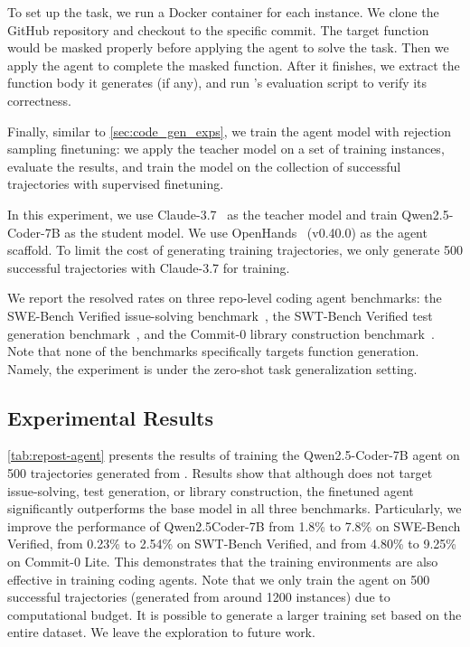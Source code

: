 To set up the task, we run a Docker container for each \reposttrainsetName instance. We clone the GitHub repository and checkout to the specific commit. The target function would be masked properly before applying the agent to solve the task.
Then we apply the agent to complete the masked function.
After it finishes, we extract the function body it generates (if any), and run \repostmethodName's evaluation script to verify its correctness.

Finally, similar to \autoref{sec:code_gen_exps}, we train the agent model with rejection sampling finetuning: we apply the teacher model on a set of training instances, evaluate the results, and train the model on the collection of successful trajectories with supervised finetuning.

In this experiment, we use Claude-3.7~\cite{claude37} as the teacher model and train Qwen2.5-Coder-7B as the student model. We use OpenHands~\cite{openhands} (v0.40.0) as the agent scaffold.
To limit the cost of generating training trajectories, we only generate 500 successful trajectories with Claude-3.7 for training.

We report the resolved rates on three repo-level coding agent benchmarks: the SWE-Bench Verified issue-solving benchmark~\cite{swebench}, the SWT-Bench Verified test generation benchmark~\cite{swt-bench}, and the Commit-0 library construction benchmark~\cite{commit0}.
Note that none of the benchmarks specifically targets function generation. Namely, the experiment is under the zero-shot task generalization setting.

\subsection{Experimental Results}
\autoref{tab:repost-agent} presents the results of training the Qwen2.5-Coder-7B agent on 500 trajectories generated from \reposttrainsetName.
Results show that although \reposttrainsetName does not target issue-solving, test generation, or library construction, the finetuned agent significantly outperforms the base model in all three benchmarks.
Particularly, we improve the performance of Qwen2.5Coder-7B from 1.8\% to 7.8\% on SWE-Bench Verified, from 0.23\% to 2.54\% on SWT-Bench Verified, and from 4.80\% to 9.25\% on Commit-0 Lite.
This demonstrates that the \repostmethodName training environments are also effective in training coding agents.
Note that we only train the agent on 500 successful trajectories (generated from around 1200 \reposttrainsetName instances) due to computational budget.
It is possible to generate a larger training set based on the entire \reposttrainsetName dataset. We leave the exploration to future work.

